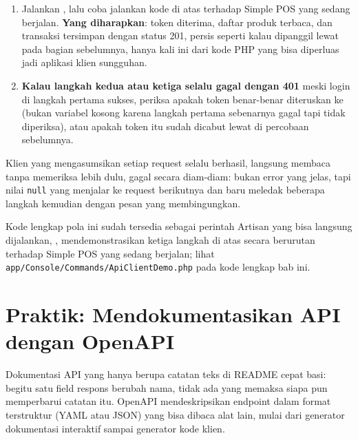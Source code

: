 \begin{enumerate}
\begin{lstlisting}[language=php, title=\lstfile{app/Console/Commands/ApiClientDemo.php}]
match ($transaction->status()) {
    201 => /* transaksi tersimpan, baca $transaction->json('data') */,
    401 => /* token tidak valid, login ulang */,
    422 => /* input ditolak, tampilkan $transaction->json('message') */,
    default => /* galat lain, tampilkan ke pengguna */,
};
    \end{lstlisting}
  \item Jalankan , lalu coba jalankan
    kode di atas terhadap Simple POS yang sedang berjalan.
    \textbf{Yang diharapkan}: token diterima, daftar produk terbaca,
    dan transaksi tersimpan dengan status 201, persis seperti kalau
    dipanggil lewat  pada bagian sebelumnya, hanya kali ini
    dari kode PHP yang bisa diperluas jadi aplikasi klien sungguhan.
  \item \textbf{Kalau langkah kedua atau ketiga selalu gagal dengan
    401} meski login di langkah pertama sukses, periksa apakah token
    benar-benar diteruskan ke  (bukan variabel
    kosong karena langkah pertama sebenarnya gagal tapi tidak
    diperiksa), atau apakah token itu sudah dicabut lewat
     di percobaan sebelumnya.
\end{enumerate}

\begin{warningbox}
Klien yang mengasumsikan setiap request selalu berhasil, langsung
membaca  tanpa memeriksa
 lebih dulu, gagal secara diam-diam: bukan error
yang jelas, tapi nilai \texttt{null} yang menjalar ke request
berikutnya dan baru meledak beberapa langkah kemudian dengan pesan
yang membingungkan.
\end{warningbox}

Kode lengkap pola ini sudah tersedia sebagai perintah Artisan yang
bisa langsung dijalankan, , mendemonstrasikan
ketiga langkah di atas secara berurutan terhadap Simple POS yang
sedang berjalan; lihat \texttt{app/Console/Commands/ApiClientDemo.php}
pada kode lengkap bab ini.

\section{Praktik: Mendokumentasikan API dengan OpenAPI}
\label{sec:membangun-rest-api-4}

Dokumentasi API yang hanya berupa catatan teks di README cepat basi:
begitu satu field respons berubah nama, tidak ada yang memaksa siapa
pun memperbarui catatan itu. OpenAPI mendeskripsikan endpoint dalam
format terstruktur (YAML atau JSON) yang bisa dibaca alat lain, mulai
dari generator dokumentasi interaktif sampai generator kode klien.

